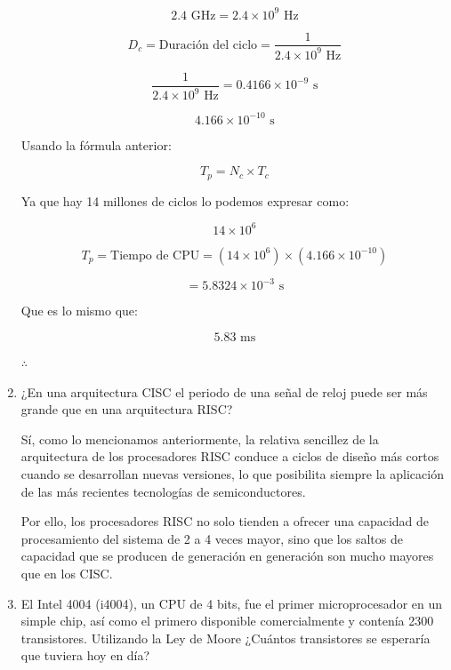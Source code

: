 \documentclass[12pt,letterpaper]{article}
\begin{document}
\begin{enumerate}
  \[
  2.4 \text{ GHz} = 2.4 \times 10^9 \text{ Hz}
  \]
  
  \[
  D_c = \text{Duración del ciclo} = \frac{1}{2.4 \times 10^9 \text{ Hz}}
  \]
  
  \[
  \frac{1}{2.4 \times 10^9 \text{ Hz}} = 0.4166 \times 10^{-9} \text{ s}
  \]

  \[
  4.166 \times 10^{-10} \text{ s}
  \]
  
  Usando la f\'{o}rmula anterior:
  
  
  \[
  T_p = N_c \times T_c
  \]
  
  Ya que hay 14 millones de ciclos lo podemos expresar como:

  \[
  14 \times 10^6
  \]

  \[
  T_p = \text{Tiempo de CPU} = (14 \times 10^6) \times (4.166 \times 10^{-10}) 
  \]

  \[
  = 5.8324 \times 10^{-3} \text{ s}
  \]

  Que es lo mismo que:

  \[
  5.83 \text{ ms}
  \]

  \begin{center}
    \(\therefore\) \\
  \end{center}
  \bigskip
  
\item ¿En una arquitectura CISC el periodo de una señal de reloj puede ser más grande que en una arquitectura RISC?
  \bigskip

  Sí, como lo mencionamos anteriormente, la relativa sencillez de la arquitectura de los procesadores RISC conduce a ciclos de diseño más cortos cuando se desarrollan nuevas versiones, lo que posibilita siempre la aplicación de las más recientes tecnologías de semiconductores.

  Por ello, los procesadores RISC no solo tienden a ofrecer una capacidad de procesamiento del sistema de 2 a 4 veces mayor, sino que los saltos de capacidad que se producen de generación en generación son mucho mayores que en los CISC.
  \bigskip
  
\item El Intel 4004 (i4004), un CPU de 4 bits, fue el primer microprocesador en un simple chip, así como el primero disponible comercialmente y contenía 2300 transistores. Utilizando la Ley de Moore ¿Cuántos transistores se esperaría que tuviera hoy en día?
  \bigskip


\end{enumerate}
\end{document}
